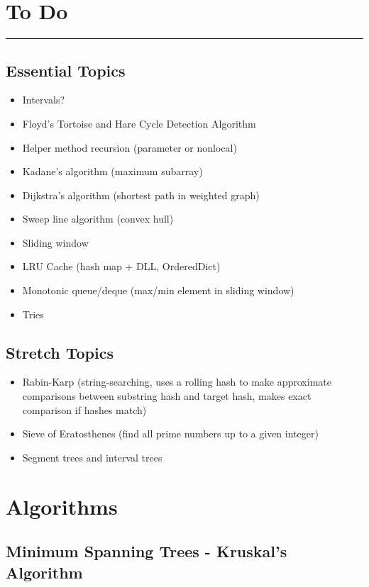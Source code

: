 \documentclass[12pt, titlepage]{article}
\begin{document}
\section{To Do}
\hrule\vspace{5ex}

\subsection{Essential Topics}
\begin{itemize}
  \item Intervals?
  \item Floyd's Tortoise and Hare Cycle Detection Algorithm
  \item Helper method recursion (parameter or nonlocal)
  \item Kadane's algorithm (maximum subarray)
  \item Dijkstra's algorithm (shortest path in weighted graph)
  \item Sweep line algorithm (convex hull)
  \item Sliding window
  \item LRU Cache (hash map + DLL, OrderedDict)
  \item Monotonic queue/deque (max/min element in sliding window) %
  \item Tries
\end{itemize}

\subsection{Stretch Topics}
\begin{itemize}
  \item Rabin-Karp (string-searching, uses a rolling hash to make approximate comparisons between substring hash and target hash, makes exact comparison if hashes match)
  \item Sieve of Eratosthenes (find all prime numbers up to a given integer)
  \item Segment trees and interval trees
\end{itemize}

\newpage
\appendix

\section{Algorithms}

\subsection{Minimum Spanning Trees - Kruskal's Algorithm}
\end{document}
